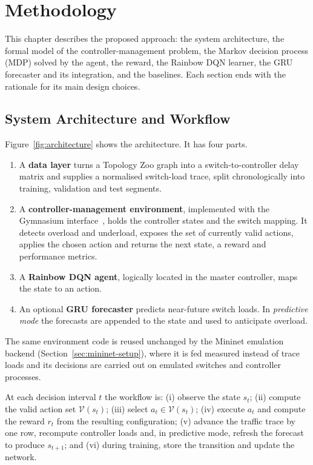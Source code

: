 \chapter{Methodology}
\label{ch:method}

This chapter describes the proposed approach: the system architecture, the formal model of the controller-management problem, the Markov decision process (MDP) solved by the agent, the reward, the Rainbow DQN learner, the GRU forecaster and its integration, and the baselines. Each section ends with the rationale for its main design choices.

\section{System Architecture and Workflow}
\label{sec:architecture}

Figure~\ref{fig:architecture} shows the architecture. It has four parts.
\begin{enumerate}[leftmargin=*]
  \item A \textbf{data layer} turns a Topology Zoo graph into a switch-to-controller delay matrix and supplies a normalised switch-load trace, split chronologically into training, validation and test segments.
  \item A \textbf{controller-management environment}, implemented with the Gymnasium interface~\cite{towers2024gymnasium}, holds the controller states and the switch mapping. It detects overload and underload, exposes the set of currently valid actions, applies the chosen action and returns the next state, a reward and performance metrics.
  \item A \textbf{Rainbow DQN agent}, logically located in the master controller, maps the state to an action.
  \item An optional \textbf{GRU forecaster} predicts near-future switch loads. In \emph{predictive mode} the forecasts are appended to the state and used to anticipate overload.
\end{enumerate}

The same environment code is reused unchanged by the Mininet emulation backend (Section~\ref{sec:mininet-setup}), where it is fed measured instead of trace loads and its decisions are carried out on emulated switches and controller processes.

At each decision interval $t$ the workflow is: (i) observe the state $s_t$; (ii) compute the valid action set $\mathcal{V}(s_t)$; (iii) select $a_t\in\mathcal{V}(s_t)$; (iv) execute $a_t$ and compute the reward $r_t$ from the resulting configuration; (v) advance the traffic trace by one row, recompute controller loads and, in predictive mode, refresh the forecast to produce $s_{t+1}$; and (vi) during training, store the transition and update the network.

